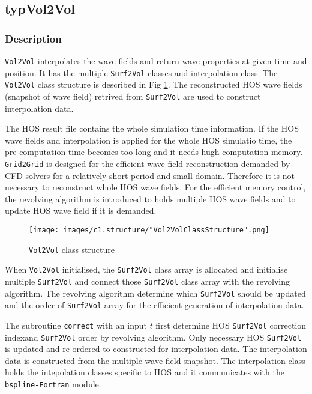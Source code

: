 	\pagebreak
	\subsection{typVol2Vol}

	\subsubsection{Description}

	\texttt{Vol2Vol} interpolates the wave fields and return wave properties at given time and position. It has the multiple \texttt{Surf2Vol} classes and interpolation class. The \texttt{Vol2Vol} class structure is described in Fig \ref{fig:vol2volStructure}. The reconstructed HOS wave fields (snapshot of wave field) retrived from \texttt{Surf2Vol} are used to construct interpolation data. 
	
	The HOS result file contains the whole simulation time information. If the HOS wave fields and interpolation is applied for the whole HOS simulatio time, the pre-computation time becomes too long and it needs hugh computation memory. \texttt{Grid2Grid} is designed for the efficient wave-field reconstruction demanded by CFD solvers for a relatively short period and small domain. Therefore it is not necessary to reconstruct whole HOS wave fields. For the efficient memory control, the revolving algorithm is introduced to holds multiple HOS wave fields and to update HOS wave field if it is demanded.

	\vspace{1em}
	{
		\begin{figure} [H]
			\centering
			\texttt{[image: images/c1.structure/"Vol2VolClassStructure".png]}
			\vspace{0.2cm}
			\caption{\texttt{Vol2Vol} class structure}
			\label{fig:vol2volStructure}
		\end{figure}
	}

	\pagebreak

	When \texttt{Vol2Vol} initialised, the \texttt{Surf2Vol} class array is allocated and initialise multiple \texttt{Surf2Vol} and connect those \texttt{Surf2Vol} class array with the revolving algorithm. The revolving algorithm determine which \texttt{Surf2Vol} should be updated and the order of \texttt{Surf2Vol} array for the efficient generation of interpolation data. 
	
	The subroutine \texttt{correct} with an input $t$ first determine HOS \texttt{Surf2Vol} correction indexand \texttt{Surf2Vol} order by revolving algorithm. Only necessary HOS \texttt{Surf2Vol} is updated and re-ordered to constructed for interpolation data. The interpolation data is constructed from the multiple wave field snapshot. The interpolation class holds the intepolation classes specific to HOS and it communicates with the \texttt{bspline-Fortran} module.

